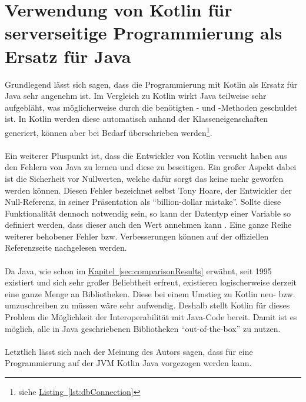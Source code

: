 \section{Verwendung von Kotlin für serverseitige Programmierung als Ersatz für Java}\label{sec:conclusionKotlinJava}
Grundlegend lässt sich sagen, dass die Programmierung mit Kotlin als Ersatz für Java sehr angenehm ist. Im Vergleich zu Kotlin wirkt Java teilweise sehr aufgebläht, was möglicherweise durch die benötigten - und -Methoden geschuldet ist. In Kotlin werden diese automatisch anhand der Klasseneigenschaften generiert, können aber bei Bedarf überschrieben werden\footnote{siehe \hyperref[lst:dbConnection]{Listing~\ref{lst:dbConnection}}}.\\
\\
Ein weiterer Pluspunkt ist, dass die Entwickler von Kotlin versucht haben aus den Fehlern von Java zu lernen und diese zu beseitigen. Ein großer Aspekt dabei ist die Sicherheit vor Nullwerten, welche dafür sorgt das keine  mehr geworfen werden können. Diesen Fehler bezeichnet selbst Tony Hoare, der Entwickler der Null-Referenz, in seiner Präsentation \cite{billionDollorMistake} als \enquote{billion-dollar mistake}. Sollte diese Funktionalität dennoch notwendig sein, so kann der Datentyp einer Variable so definiert werden, dass dieser auch den Wert  annehmen kann \cite{kotlinNullSafety}. Eine ganze Reihe weiterer behobener Fehler bzw. Verbesserungen können auf der offiziellen Referenzseite \cite{kotlinComparisionJava} nachgelesen werden.\\
\\
Da Java, wie schon im \hyperref[sec:comparisonResults]{Kapitel~\ref{sec:comparisonResults}} erwähnt, seit 1995 existiert und sich sehr großer Beliebtheit erfreut, existieren logischerweise derzeit eine ganze Menge an Bibliotheken. Diese bei einem Umstieg zu Kotlin neu- bzw. umzuschreiben zu müssen wäre sehr aufwendig. Deshalb stellt Kotlin für dieses Problem die Möglichkeit der Interoperabilität mit Java-Code bereit. Damit ist es möglich, alle in Java geschriebenen Bibliotheken \enquote{out-of-the-box} zu nutzen.\\
\\
Letztlich lässt sich nach der Meinung des Autors sagen, dass für eine Programmierung auf der \gls{JVM} Kotlin Java vorgezogen werden kann.

